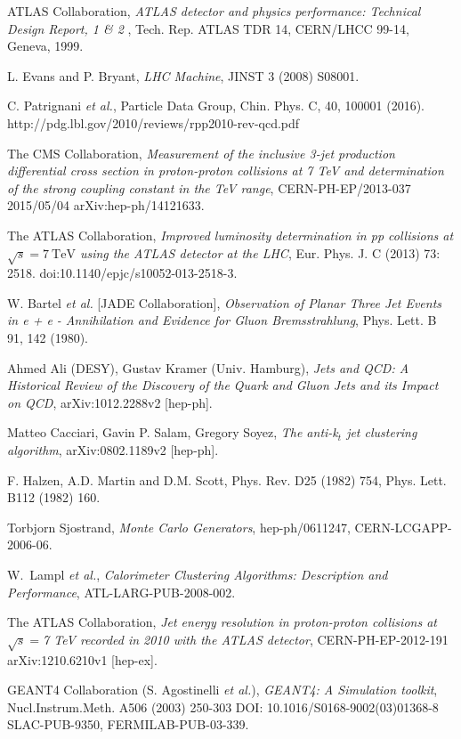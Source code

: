 \documentclass[UKenglish,texlive=2013]{\ATLASLATEXPATH atlasdoc}
\begin{document}
\begin{thebibliography}{9}
  ATLAS Collaboration,
  \emph{ATLAS detector and physics performance: Technical Design Report, 1 \& 2} ,
  Tech. Rep. ATLAS TDR 14, CERN/LHCC 99-14, Geneva, 1999.

L. Evans and P. Bryant,
\emph{LHC Machine}, JINST 3 (2008) S08001.

C. Patrignani \emph{et al.},
Particle Data Group, Chin. Phys. C, 40, 100001 (2016).
http://pdg.lbl.gov/2010/reviews/rpp2010-rev-qcd.pdf

The CMS Collaboration,
\emph{Measurement of the inclusive 3-jet production differential
cross section in proton-proton collisions at 7 TeV and
determination of the strong coupling constant in the TeV
range},
CERN-PH-EP/2013-037
2015/05/04
arXiv:hep-ph/14121633.

The ATLAS Collaboration,
\emph{Improved luminosity determination in pp collisions at $\sqrt {s} = 7\ \mathrm{TeV}$ using the ATLAS detector at the LHC},
Eur. Phys. J. C (2013) 73: 2518. doi:10.1140/epjc/s10052-013-2518-3.

W. Bartel \emph{et al.} [JADE Collaboration],
\emph{Observation of Planar Three Jet Events in e + e -
Annihilation and Evidence for Gluon Bremsstrahlung},
Phys. Lett. B 91, 142 (1980).

Ahmed Ali (DESY), Gustav Kramer (Univ. Hamburg),
\emph{Jets and QCD: A Historical Review of the Discovery of the Quark and Gluon Jets and its Impact on QCD},
arXiv:1012.2288v2 [hep-ph].

Matteo Cacciari, Gavin P. Salam, Gregory Soyez,
\emph{The anti-k$_t$ jet clustering algorithm},
arXiv:0802.1189v2 [hep-ph]. 

F. Halzen, A.D. Martin and D.M. Scott,  
Phys. Rev. D25 (1982) 754,
Phys. Lett. B112 (1982) 160.

Torbjorn Sjostrand,
\emph{Monte Carlo Generators},
hep-ph/0611247,
CERN-LCGAPP-2006-06.

W.~Lampl \emph{et al.},
\emph{Calorimeter Clustering Algorithms: Description and Performance},
ATL-LARG-PUB-2008-002.

The ATLAS Collaboration,
\emph{Jet energy resolution in proton-proton collisions at $\sqrt{s}=$7 TeV recorded in 2010 with the ATLAS detector},
CERN-PH-EP-2012-191
arXiv:1210.6210v1  [hep-ex].

GEANT4 Collaboration (S. Agostinelli \emph{et al.}), 
\emph{GEANT4: A Simulation toolkit},
Nucl.Instrum.Meth. A506 (2003) 250-303
DOI: 10.1016/S0168-9002(03)01368-8
SLAC-PUB-9350, FERMILAB-PUB-03-339.


\end{thebibliography}
\end{document}
